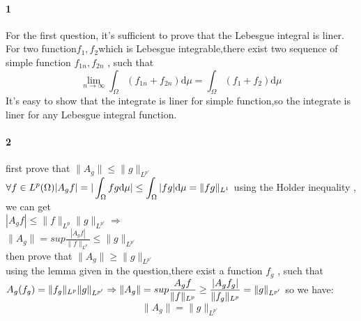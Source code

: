 \documentclass[14pt,a4paper]{article}
\begin{document}
\paragraph{1}
For the first question, it's sufficient to prove that the Lebesgue integral is liner.\\
  \indent For two function$f_1 , f_2$which is Lebesgue integrable,there exist two sequence of simple function $f_{1n},f_{2n}$ , such that $$\lim\limits_{n \to \infty}\int_{\Omega}(f_{1n} + f_{2n})\mathrm{d}\mu = \int_{\Omega}(f_{1} + f_{2})\mathrm{d}\mu$$
  \indent It's easy to show that the integrate is liner for simple function,so the integrate is liner for any Lebesgue integral function.
\paragraph{2}
first prove that $\|A_g\| \leq \|g\|_{L^{p'}}$\\
$\displaystyle
\forall f \in L^p(\Omega) \\
 |A_gf| = |\int_{\Omega}fg\mathrm{d}\mu| \leq \int_{\Omega}|fg|\mathrm{d}\mu = \|fg\|_{L^1}
$
using the Holder inequality , we can get \\
$|A_gf| \leq \|f\|_{L^p}\|g\|_{L^{p'}} \Rightarrow $\\
$\displaystyle \|A_g\| = sup\frac{|A_gf|}{\|f\|_{L^p}} \leq \|g\|_{L^{p'}}
$\\
then prove that $\|A_g\| \ge \|g\|_{L^{p'}}$\\
using the lemma given in the question,there exist a function $f_g$ , such that\\
$\displaystyle A_g(f_g) = \|f_g\|_{L^p}\|g\|_{L^{p'}}\Rightarrow\\
\|A_g\| = sup\frac{A_gf}{\|f\|_{L^p}} \ge \frac{|A_gf_g|}{\|f_g\|_{L^p}} = \|g\|_{L^{p'}}
$
so we have: $$\|A_g\| = \|g\|_{L^{p'}}$$
\end{document}
